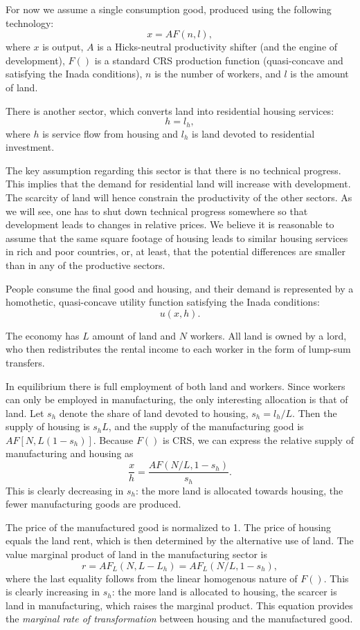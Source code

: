 \documentclass[12pt]{article}
\begin{document}
For now we assume a single consumption good, produced using the following technology:
\[
x = AF(n,l),
\]
where $x$ is output, $A$ is a Hicks-neutral productivity shifter (and the engine of development), $F()$ is a standard CRS production function (quasi-concave and satisfying the Inada conditions), $n$ is the number of workers, and $l$ is the amount of land.

There is another sector, which converts land into residential housing services:
\[
h = l_h,
\]
where $h$ is service flow from housing and $l_h$ is land devoted to residential investment.

The key assumption regarding this sector is that there is no technical progress. This implies that the demand for residential land will increase with development. The scarcity of land will hence constrain the productivity of the other sectors. As we will see, one has to shut down technical progress somewhere so that development leads to changes in relative prices. We believe it is reasonable to assume that the same square footage of housing leads to similar housing services in rich and poor countries, or, at least, that the potential differences are smaller than in any of the productive sectors.

People consume the final good and housing, and their demand is represented by a homothetic, quasi-concave utility function satisfying the Inada conditions:
\[
u(x,h).
\]

The economy has $L$ amount of land and $N$ workers. All land is owned by a lord, who then redistributes the rental income to each worker in the form of lump-sum transfers.

In equilibrium there is full employment of both land and workers. Since workers can only be employed in manufacturing, the only interesting allocation is that of land. Let $s_h$ denote the share of land devoted to housing, $s_h = l_h/L$. Then the supply of housing is $s_h L$, and the supply of the manufacturing good is $AF[N,L(1-s_h)]$. Because $F()$ is CRS, we can express the relative supply of manufacturing and housing as
\[
\frac{x}{h} = \frac{AF(N/L,1-s_h)}{s_h}.
\]
This is clearly decreasing in $s_h$: the more land is allocated towards housing, the fewer manufacturing goods are produced.

The price of the manufactured good is normalized to 1. The price of housing equals the land rent, which is then determined by the alternative use of land. The value marginal product of land in the manufacturing sector is
\begin{equation}\label{eq:MRT}
r = AF_L(N,L-L_h) = AF_L(N/L,1-s_h),
\end{equation}
where the last equality follows from the linear homogenous nature of $F()$. This is clearly increasing in $s_h$: the more land is allocated to housing, the scarcer is land in manufacturing, which raises the marginal product. This equation provides the \emph{marginal rate of transformation} between housing and the manufactured good.
\end{document}
